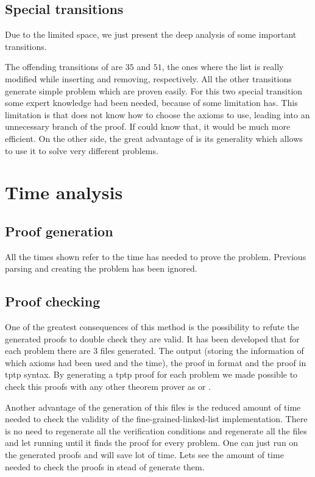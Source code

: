 \subsection{Special transitions}

Due to the limited space, we just present the deep analysis of some important transitions.

The offending transitions of \invPreserve are $35$ and $51$, the ones where the list is really modified while inserting and removing, respectively.
%
All the other transitions generate simple \spass problem which are proven easily.
%
For this two special transition some expert knowledge had been needed, because of some limitation \spass has.
%
This limitation is that \spass does not know how to choose the axioms to use, leading into an unnecessary branch of the proof. 
%
If \spass could know that, it would be much more efficient. 
%
On the other side, the great advantage of \spass is its generality which allows to use it to solve very different problems. 


\section{Time analysis}
\label{sec:timeanalysis}

\subsection{Proof generation}

All the times shown refer to the time \spass has needed to prove the problem. 
%
Previous parsing and creating the \spass problem has been ignored.



\subsection{Proof checking}

One of the greatest consequences of this method is the possibility to refute the generated proofs to double check they are valid.
%
It has been developed that for each \spass problem there are 3 files generated. The \spass output (storing the information of which axioms had been used and the time), the \spass proof in \spass format and the \spass proof in \gls{tptp} syntax.
%
By generating a tptp proof for each \spass problem we made possible to check this proofs with any other theorem prover as  or .

Another advantage of the generation of this files is the reduced amount of time needed to check the validity of the fine-grained-linked-list implementation. 
%
There is no need to regenerate all the verification conditions and regenerate all the \spass files and let \spass running until it finds the proof for every problem. 
%
One can just run \spass on the generated proofs and will save lot of time.
%
Lets see the amount of time needed to check the proofs in stead of generate them.


